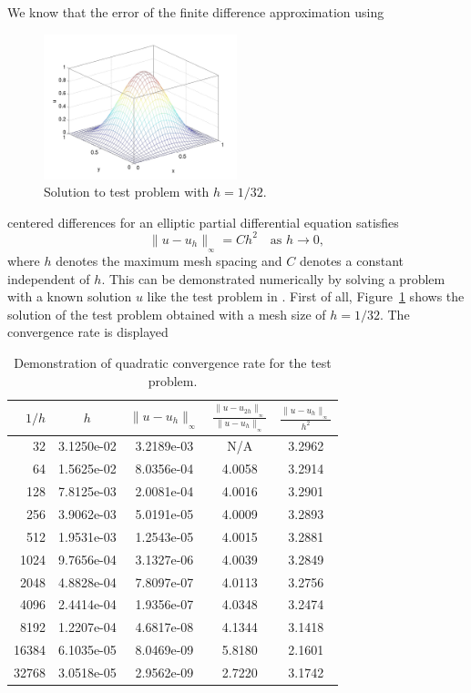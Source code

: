 \documentclass[12pt]{article}
\numberwithin{equation}{section}
\numberwithin{table}{section}
\numberwithin{figure}{section}
\newcommand{\norm}[2]{\|{#1}\|_{{}_{#2}}}
\begin{document}
We know that the error of the finite difference approximation using
\begin{figure} \centering
  \includegraphics[width=0.5\textwidth]{mesh_solution}
  \caption{Solution to test problem with $h = 1 / 32$.}
  \label{figsolplot}
\end{figure}
centered differences for an elliptic partial differential equation
satisfies
\begin{equation} \label{equconvratequad}
  \norm{u - u_h}{\infty} = C h^2 \quad \mbox{as $h \rightarrow 0$},
\end{equation}
where $h$ denotes the maximum mesh spacing and
$C$ denotes a constant independent of $h$.
This can be demonstrated numerically by solving a problem with
a known solution $u$ like the test problem in \cite{RaimGobbert2010Poisson}.
First of all,
Figure~\ref{figsolplot} shows the solution of the test problem obtained with
a mesh size of $h = 1 / 32$.
The convergence rate is displayed
\begin{table} \centering
  \begin{tabular}{rcccc}
    \hline
    $1 / h$ & $h$ & $\norm{u - u_h}{\infty}$ &
      $\frac{\norm{u - u_{2h}}{\infty}}{\norm{u - u_h}{\infty}}$ &
      $\frac{\norm{u - u_h}{\infty}}{h^2}$ \\
    \hline
       32 &   3.1250e-02 & 3.2189e-03 &   N/A  & 3.2962 \\
       64 &   1.5625e-02 & 8.0356e-04 & 4.0058 & 3.2914 \\
      128 &   7.8125e-03 & 2.0081e-04 & 4.0016 & 3.2901 \\
      256 &   3.9062e-03 & 5.0191e-05 & 4.0009 & 3.2893 \\
      512 &   1.9531e-03 & 1.2543e-05 & 4.0015 & 3.2881 \\
     1024 &   9.7656e-04 & 3.1327e-06 & 4.0039 & 3.2849 \\
     2048 &   4.8828e-04 & 7.8097e-07 & 4.0113 & 3.2756 \\
     4096 &   2.4414e-04 & 1.9356e-07 & 4.0348 & 3.2474 \\
     8192 &   1.2207e-04 & 4.6817e-08 & 4.1344 & 3.1418 \\
    16384 &   6.1035e-05 & 8.0469e-09 & 5.8180 & 2.1601 \\
    32768 &   3.0518e-05 & 2.9562e-09 & 2.7220 & 3.1742 \\
    \hline
  \end{tabular}
  \caption{Demonstration of quadratic convergence rate for the test problem.}
  \label{tabconvdemo}
\end{table}
\end{document}
